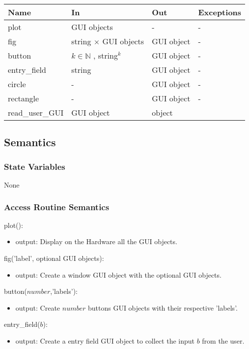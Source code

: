 \documentclass[12pt, titlepage]{article}
\begin{document}
\begin{center}
\begin{tabular}{p{3cm} p{4cm} p{4cm} p{3cm}}
\hline
\textbf{Name} & \textbf{In} & \textbf{Out} & \textbf{Exceptions} \\
\hline
plot & GUI objects & - & - \\
fig & string $\times$ GUI objects &  GUI object & - \\
button & $k \in \mathbb{N}$ , {string}$^{k}$ &  GUI object & - \\
entry{\_}field & string &  GUI object & - \\
circle & - &  GUI object & - \\
rectangle & - & GUI object & - \\
read{\_}user{\_}GUI & GUI object & object \\
\hline
\end{tabular}
\end{center}

\subsection{Semantics}

\subsubsection{State Variables}
None

\subsubsection{Access Routine Semantics}

\noindent plot():
\begin{itemize}
\item output: Display on the Hardware all the GUI objects.
\end{itemize}

\noindent fig('label', optional GUI objects):
\begin{itemize}
\item output: Create a window GUI object with the optional GUI objects.
\end{itemize}

\noindent button($number$,'labels'):
\begin{itemize}
\item output: Create $number$ buttons GUI objects with their respective 
'labels'.
\end{itemize}

\noindent entry{\_}field($b$):
\begin{itemize}
\item output: Create a entry field GUI object to collect the input $b$ from the 
user.
\end{itemize}
\end{document}
